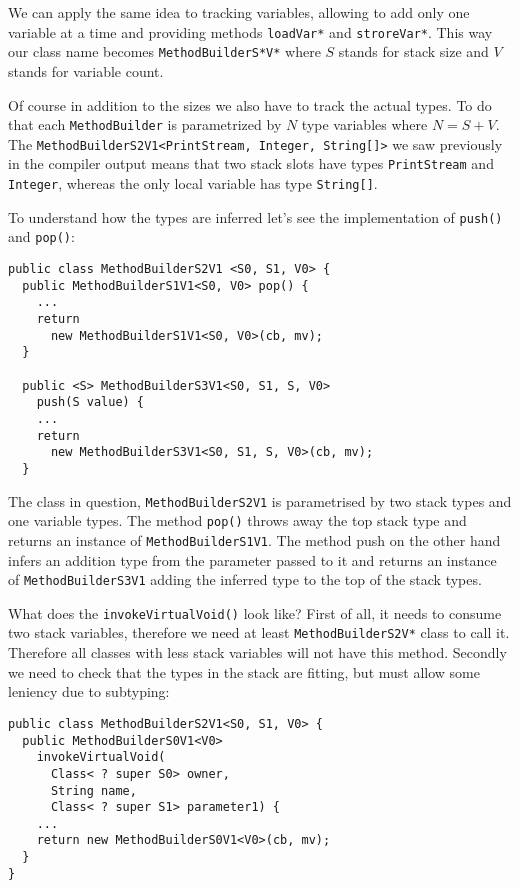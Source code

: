 \documentclass{sig-alternate}
\begin{document}
We can apply the same idea to tracking variables, allowing to add only one variable at a time and providing methods \verb!loadVar*! and \verb!stroreVar*!. This way our class name becomes \verb!MethodBuilderS*V*! where $S$ stands for stack size and $V$ stands for variable count.

Of course in addition to the sizes we also have to track the actual types. To do that each \verb!MethodBuilder! is parametrized by $N$ type variables where $N = S + V$. The \verb!MethodBuilderS2V1<PrintStream, Integer, String[]>! we saw previously in the compiler output means that two stack slots have types \verb!PrintStream! and \verb!Integer!, whereas the only local variable has type \verb!String[]!.

To understand how the types are inferred let's see the implementation of \verb!push()! and \verb!pop()!:

\begin{verbatim}
public class MethodBuilderS2V1 <S0, S1, V0> {
  public MethodBuilderS1V1<S0, V0> pop() {
    ...
    return 
      new MethodBuilderS1V1<S0, V0>(cb, mv);
  }

  public <S> MethodBuilderS3V1<S0, S1, S, V0> 
    push(S value) {
    ...
    return 
      new MethodBuilderS3V1<S0, S1, S, V0>(cb, mv);
  }
\end{verbatim}

The class in question, \verb!MethodBuilderS2V1! is parametrised by two stack types and one variable types. The method \verb!pop()! throws away the top stack type and returns an instance of \verb!MethodBuilderS1V1!. The method push on the other hand infers an addition type from the parameter passed to it and returns an instance of \verb!MethodBuilderS3V1! adding the inferred type to the top of the stack types.

What does the \verb!invokeVirtualVoid()! look like? First of all, it needs to consume two stack variables, therefore we need at least \verb!MethodBuilderS2V*! class to call it. Therefore all classes with less stack variables will not have this method. Secondly we need to check that the types in the stack are fitting, but must allow some leniency due to subtyping:

\begin{verbatim}
public class MethodBuilderS2V1<S0, S1, V0> {
  public MethodBuilderS0V1<V0> 
    invokeVirtualVoid(
      Class< ? super S0> owner, 
      String name, 
      Class< ? super S1> parameter1) {
    ...    
    return new MethodBuilderS0V1<V0>(cb, mv);
  }
}
\end{verbatim}
\end{document}
